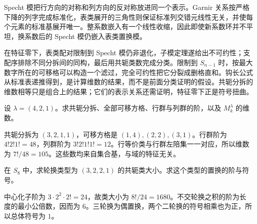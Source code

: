 \begin{chaptersummary}
	Specht 模把行方向的对称和列方向的反对称放进同一个表示。Garnir 关系按严格下降的列字完成标准化，表类展开的三角性则保证标准列交错元线性无关，并使每个元素的标准基展开唯一。整系数嵌入有一个线性收缩，因此即使新系数环并不平坦，换系数后的 Specht 模仍嵌入表类置换模。

	\ProseParagraphBreak

	在特征零下，表类配对限制到 Specht 模仍非退化，子模定理遂给出不可约性；支配序排除不同分拆间的同构，最后用共轭类数完成分类。限制到 \(S_{n-1}\) 时，按最大数字所在的可移格可以构造一个滤过，完全可约性把它分裂成删格直和。钩长公式从标准表递推得到，是计算维数的结果，而不是前面分类证明的假设。共轭分拆的维数相等只是组合上的结果；它们的表示关系还需证明，特征零下正是符号扭曲。
\end{chaptersummary}

\BookExercises

\begin{exercise}\label{b5:ex:06-diagram-groups}
	设 \(\lambda=(4,2,1)\)。求共轭分拆、全部可移方格、行群与列群的阶，以及 \(M_k^\lambda\) 的维数。
\end{exercise}
\begin{solution}
	共轭分拆为 \((3,2,1,1)\)，可移方格是 \((1,4),(2,2),(3,1)\)。行群阶为 \(4!2!1!=48\)，列群阶为 \(3!2!1!1!=12\)。行等价类与行群左陪集一一对应，所以维数为 \(7!/48=105\)。这些数均来自集合基，与域的特征无关。
\end{solution}

\begin{exercise}\label{b5:ex:06-cycle-type}
	在 \(S_8\) 中，求轮换类型为 \((3,2,2,1)\) 的共轭类大小。求这个类型的置换的阶与符号。
\end{exercise}
\begin{solution}
	中心化子阶为 \(3\cdot2^2\cdot2!=24\)，故类大小为 \(8!/24=1680\)。不交轮换之积的阶为长度的最小公倍数，因而为 \(6\)。三轮换为偶置换，两个二轮换的符号相乘也为正，所以总体符号为 \(1\)。
\end{solution}

